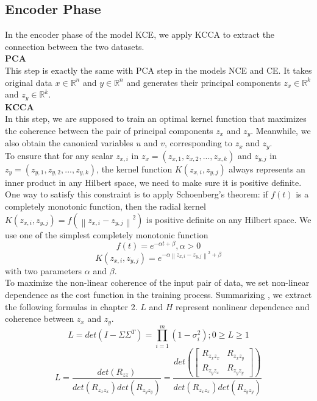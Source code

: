 \documentclass[12pt]{report} %
\newcommand{\norm}[1]{\left\lVert #1 \right\rVert}
\begin{document}
\subsection{Encoder Phase}
In the encoder phase of the model KCE, we apply KCCA to extract the connection between the two datasets. \\

\textbf{PCA}\\
This step is exactly the same with PCA step in the models NCE and CE. It takes original data $x\in \mathbb{R}^{n}$ and $y\in \mathbb{R}^{n}$ and generates their principal components $z_x\in \mathbb{R}^{k}$ and $z_y\in \mathbb{R}^{k}$.\\

\textbf{KCCA}\\
In this step, we are supposed to train an optimal kernel function that maximizes the coherence between the pair of principal components $z_x$ and $z_y$. Meanwhile, we also obtain the canonical variables $u$ and $v$, corresponding to $z_x$ and $z_y$. \\
To ensure that for any scalar \(z_{x,i}\) in \(z_x=(z_{x,1},z_{x,2},...,z_{x,k})\) and \(z_{y,j}\) in \(z_y=(z_{y,1},z_{y,2},...,z_{y,k})\), the kernel function $K(z_{x,i},z_{y,j})$ always represents an inner product in any Hilbert space, we need to make sure it is positive definite. One way to satisfy this constraint is to apply Schoenberg's theorem: if \(f(t)\) is a completely monotonic function, then the radial kernel $K(z_{x,i},z_{y,j})=f(\norm{z_{x,i}-z_{y,j}}^2)$ is positive definite on any Hilbert space. We use one of the simplest completely monotonic function
\begin{equation}
f(t)=e^{-\alpha t + \beta}, \alpha>0
\end{equation}
\begin{equation}
K(z_{x,i},z_{y,j})=e^{-\alpha \norm{z_{x,i}-z_{y,j}}^2 + \beta}
\end{equation}
with two parameters $\alpha$ and $\beta$.\\
To maximize the non-linear coherence of the input pair of data, we set non-linear dependence as the cost function in the training process. Summarizing \cite{ECCA}, we extract the following formulas in chapter 2. $L$ and $H$ represent nonlinear dependence and coherence between $z_x$ and $z_y$.
\begin{equation}
L=det(I-\Sigma\Sigma^T)=\prod_{i=1}^{m}(1-\sigma_i^2);0 \geq L \geq 1
\end{equation}
\begin{equation}
L=\frac{det(R_{zz})}
{det(R_{z_{x}z_{x}})det(R_{z_{y}z_{y}})}=\frac{det(\begin{bmatrix}
	R_{z_{x}z_{x}} & R_{z_{x}z_{y}} \\
	R_{z_{y}z_{x}} & R_{z_{y}z_{y}}
	\end{bmatrix})}
{det(R_{z_{x}z_{x}})det(R_{z_{y}z_{y}})}
\end{equation}
\end{document}
